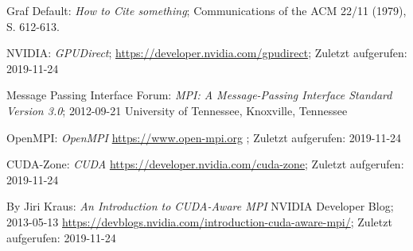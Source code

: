         Graf Default: {\sl How to Cite something}; 
        Communications of the ACM 22/11 (1979), S. 612-613.

		NVIDIA: {\sl GPUDirect};
		\url{https://developer.nvidia.com/gpudirect}; Zuletzt aufgerufen: 2019-11-24


		Message Passing Interface Forum: {\sl MPI: A Message-Passing Interface Standard Version 3.0}; 2012-09-21
		University of Tennessee, Knoxville, Tennessee

		OpenMPI: {\sl OpenMPI}
		\url{https://www.open-mpi.org} ; Zuletzt aufgerufen: 2019-11-24

		CUDA-Zone: {\sl CUDA}
		\url{https://developer.nvidia.com/cuda-zone}; Zuletzt aufgerufen: 2019-11-24

\bibitem[NV\_CUDAMPI][cudampi]
		By Jiri Kraus: {\sl An Introduction to CUDA-Aware MPI}
		NVIDIA Developer Blog; 2013-05-13	
		\url{https://devblogs.nvidia.com/introduction-cuda-aware-mpi/}; Zuletzt aufgerufen: 2019-11-24

